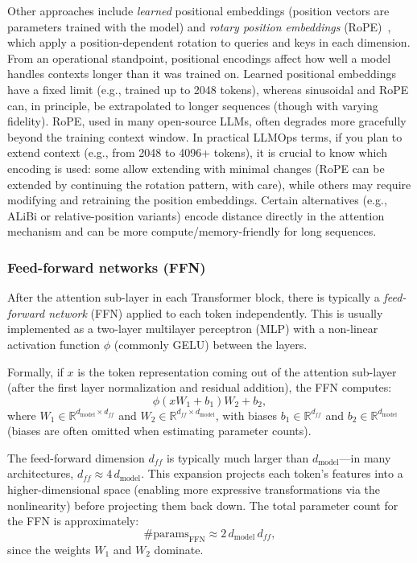 Other approaches include \emph{learned} positional embeddings (position vectors are parameters trained with the model) and \emph{rotary position embeddings} (RoPE)~\cite{su2021rope}, which apply a position-dependent rotation to queries and keys in each dimension. From an operational standpoint, positional encodings affect how well a model handles contexts longer than it was trained on. Learned positional embeddings have a fixed limit (e.g., trained up to 2048 tokens), whereas sinusoidal and RoPE can, in principle, be extrapolated to longer sequences (though with varying fidelity). RoPE, used in many open-source LLMs, often degrades more gracefully beyond the training context window. In practical LLMOps terms, if you plan to extend context (e.g., from 2048 to 4096+ tokens), it is crucial to know which encoding is used: some allow extending with minimal changes (RoPE can be extended by continuing the rotation pattern, with care), while others may require modifying and retraining the position embeddings. Certain alternatives (e.g., ALiBi or relative-position variants) encode distance directly in the attention mechanism and can be more compute/memory-friendly for long sequences.


\subsubsection{Feed-forward networks (FFN)}
After the attention sub-layer in each Transformer block, there is typically a \emph{feed-forward network} (FFN) applied to each token independently. This is usually implemented as a two-layer multilayer perceptron (MLP) with a non-linear activation function $\phi$ (commonly GELU) between the layers.  

Formally, if $x$ is the token representation coming out of the attention sub-layer (after the first layer normalization and residual addition), the FFN computes:
\begin{equation}
\phi(x W_1 + b_1) W_2 + b_2,
\label{eq:ffn-formula}
\end{equation}
where $W_1 \in \mathbb{R}^{d_{\text{model}} \times d_{ff}}$ and $W_2 \in \mathbb{R}^{d_{ff} \times d_{\text{model}}}$, with biases $b_1 \in \mathbb{R}^{d_{ff}}$ and $b_2 \in \mathbb{R}^{d_{\text{model}}}$ (biases are often omitted when estimating parameter counts).  

The feed-forward dimension $d_{ff}$ is typically much larger than $d_{\text{model}}$—in many architectures, $d_{ff} \approx 4 \, d_{\text{model}}$. This expansion projects each token’s features into a higher-dimensional space (enabling more expressive transformations via the nonlinearity) before projecting them back down. The total parameter count for the FFN is approximately:
\begin{equation}
\#\text{params}_{\text{FFN}} \approx 2 \, d_{\text{model}} \, d_{ff},
\end{equation}
since the weights $W_1$ and $W_2$ dominate.  

